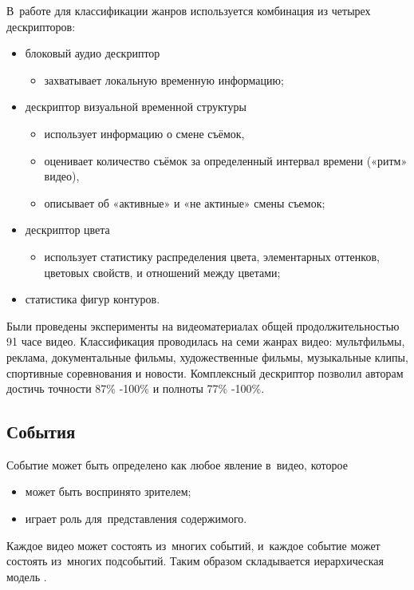 В~работе \cite{Ionescu:2012} для классификации жанров используется
комбинация из четырех дескрипторов:
\begin{itemize}
    \item блоковый аудио дескриптор
    \begin{itemize}
        \item захватывает локальную временную информацию;
    \end{itemize}
    \item дескриптор визуальной временной структуры
    \begin{itemize}
        \item использует информацию о смене съёмок,
        \item оценивает количество съёмок
            за определенный интервал времени («ритм» видео),
        \item описывает об «активные» и «не актиные» смены съемок;
    \end{itemize}
    \item дескриптор цвета
    \begin{itemize}
        \item использует статистику распределения цвета,
        элементарных оттенков, цветовых свойств, и отношений между цветами;
    \end{itemize}
    \item статистика фигур контуров.
\end{itemize}

Были проведены эксперименты на видеоматериалах общей продолжительностью
91 часе видео. Классификация проводилась на семи жанрах видео:
мультфильмы, реклама, документальные фильмы, художественные фильмы,
музыкальные клипы, спортивные соревнования и новости.
Комплексный дескриптор позволил авторам достичь
точности  87\% -100\% и полноты 77\% -100\%.



\subsection{События}

Событие может быть определено как любое явление в~видео,
которое
\begin{itemize}
    \item может быть воспринято зрителем;
    \item играет роль для~представления содержимого.
\end{itemize}
Каждое видео может состоять из~многих событий,
и~каждое событие может состоять из~многих подсобытий.
Таким образом складывается иерархическая модель \cite{Chang:2002}.

